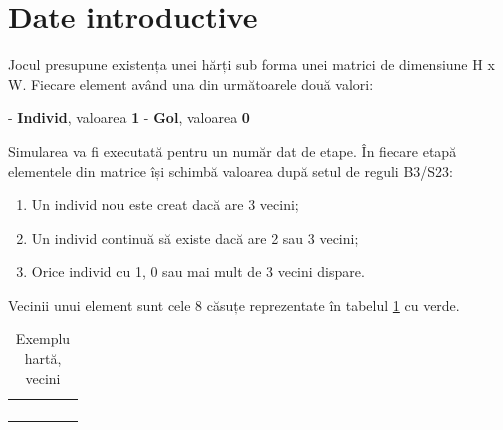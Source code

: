 \documentclass{article}
\newcounter{ProblemCounter} %
\newcommand{\ProblemName}{}
\newenvironment{Problem}[1][Sectiunea \arabic{ProblemCounter}]{ %
\stepcounter{ProblemCounter} %
\renewcommand{\ProblemName}{#1} %
\section{\ProblemName} %
}{}
\begin{document}
\begin{Problem}[Date introductive]

Jocul presupune existența unei hărți sub forma unei matrici de dimensiune H x W. Fiecare element având una din următoarele două valori:

\begin{itemize}
 - \textbf{Individ}, valoarea \textbf{1}\newline
 - \textbf{Gol}, valoarea \textbf{0}
\end{itemize}


Simularea va fi executată pentru un număr dat de etape. În fiecare etapă elementele din matrice își schimbă valoarea după setul de reguli B3/S23:
\begin{enumerate}[label=(\alph*)]
    \item Un individ nou este creat dacă are 3 vecini;
    \item Un individ continuă să existe dacă are 2 sau 3 vecini;
    \item Orice individ cu 1, 0 sau mai mult de 3 vecini dispare.
\end{enumerate}

Vecinii unui element sunt cele 8 căsuțe reprezentate în tabelul \ref{tab:map} cu verde.

\begin{table}[!hb]
    \centering
    \caption{Exemplu hartă, vecini}
    \begin{tabular}{ | m{0.5cm} | m{0.5cm}| m{0.5cm} | m{0.5cm} |m{0.5cm} | } 
      \hline
      & & & & \\ 
      \hline
      & \cellcolor{green!25} & \cellcolor{green!25} &\cellcolor{green!25} & \\ 
      \hline
      & \cellcolor{green!25}& & \cellcolor{green!25}& \\ 
      \hline
      & \cellcolor{green!25} & \cellcolor{green!25} &\cellcolor{green!25} & \\
      \hline
      & & & & \\ 
      \hline
    \end{tabular}
    \label{tab:map}
\end{table}

\clearpage
\end{Problem}

\section{ }
\end{document}
